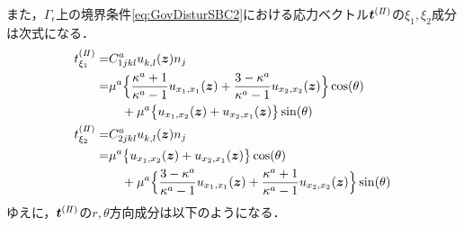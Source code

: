また，$\Gamma_\epsilon$上の境界条件\eqref{eq:GovDisturSBC2}における応力ベクトル$\bm{t}^{(I\hspace{-.15em}I)}$の$\xi_1,\xi_2$成分は次式になる．
\begin{align}
	t_{\xi_1}^{(I\hspace{-.15em}I)}=&C_{1jkl}^{a}u_{k,l}^{}(\bm{z})n_{j}
		\nonumber
		\\
		=&\mu^a\Bigl\{\frac{\kappa^a+1}{\kappa^a-1} u_{x_{1},x_{1}}(\bm{z})
		+\frac{3-\kappa^a}{\kappa^a-1} u_{x_{2},x_{2}}(\bm{z})\Bigr\}\cos(\theta)
		\nonumber
		\\
		&\quad+\mu^a\bigl\{u_{x_{1},x_{2}}(\bm{z})+u_{x_{2},x_{1}}(\bm{z})\bigr\}\sin(\theta)
	\\
	t_{\xi_2}^{(I\hspace{-.15em}I)}=&C_{2jkl}^{a}u_{k,l}^{}(\bm{z})n_{j}
		\nonumber
		\\
		=&\mu^a \bigl\{u_{x_{1},x_{2}}(\bm{z})+u_{x_{2},x_{1}}(\bm{z})\bigr\}\cos(\theta)
		\nonumber
		\\
		&\quad+\mu^a\Bigl\{ \frac{3-\kappa^a}{\kappa^a-1} u_{x_{1},x_{1}}(\bm{z})
		+\frac{\kappa^a+1}{\kappa^a-1} u_{x_{2},x_{2}}(\bm{z})\Bigr\}\sin(\theta)
\end{align}
ゆえに，$\bm{t}^{(I\hspace{-.15em}I)}$の$r,\theta$方向成分は以下のようになる．
